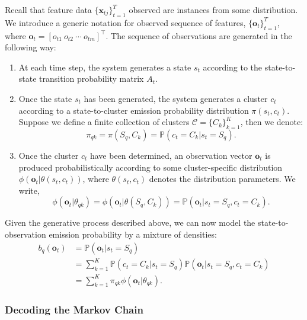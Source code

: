 Recall that feature data $\{ \mathbf{x}_{tj} \}_{t=1}^{T}$ observed are instances from some distribution. We introduce a generic notation for observed sequence of features, $\{ \mathbf{o}_{t} \}_{t=1}^{T}$, where $\mathbf{o}_t = [o_{t1} ~o_{t2} ~\cdots ~o_{tm}]^\top$. The sequence of observations are generated in the following way:
\begin{enumerate}
\item At each time step, the system generates a state $s_t$ according to the state-to-state transition probability matrix $A_t$.
\item Once the state $s_t$ has been generated, the system generates a cluster $c_t$ according to a state-to-cluster emission probability distribution $\pi(s_t,c_t)$. Suppose we define a finite collection of clusters $\mathcal{C} = \{ C_k \}_{k=1}^K$, then we denote:
\begin{equation}
\pi_{qk} = \pi(S_q, C_k) = \mathbb{P} \left( c_t = C_k | s_t = S_q \right).
\end{equation}
\item Once the cluster $c_t$ have been determined, an observation vector $\mathbf{o}_t$ is produced probabilistically according to some cluster-specific distribution $\phi(\mathbf{o}_t | \theta (s_t, c_t))$, where $\theta (s_t, c_t)$ denotes the distribution parameters. We write,
\begin{equation}
\phi(\mathbf{o}_t | \theta_{qk}) =  \phi(\mathbf{o}_t | \theta (S_q, C_k)) = \mathbb{P} \left( \mathbf{o}_t | s_t = S_q, c_t = C_k \right).
\end{equation}
\end{enumerate}
Given the generative process described above, we can now model the state-to-observation emission probability by a mixture of densities:
\begin{subequations}
\begin{align}
b_q (\mathbf{o}_t) & = \mathbb{P} \left( \mathbf{o}_t | s_t = S_q \right) \\
 & = \sum_{k=1}^K  \mathbb{P} \left( c_t = C_k | s_t = S_q \right) \mathbb{P} \left( \mathbf{o}_t | s_t = S_q, c_t = C_k \right) \\
 & = \sum_{k=1}^K \pi_{qk} \phi(\mathbf{o}_t | \theta_{qk}).
\end{align}
\label{eq:emission}
\end{subequations}

\subsubsection{Decoding the Markov Chain}

